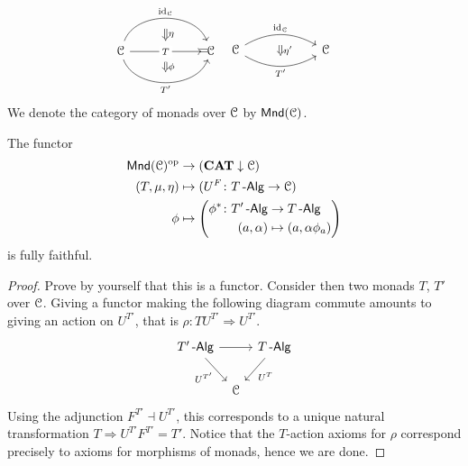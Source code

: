 \documentclass[a4paper,11pt,oneside,openany]{scrbook}
\begin{document}
\begin{defn}
\[\begin{minipage}{0.3\linewidth}
			\begin{tikzcd}[row sep=1cm, column sep=1cm]
				\C\ar[rr, bend left=70, "\id_{\C}", ""{name=id, anchor=center}]\ar[rr, "T" description, ""{name=T1, anchor=center}]\ar[rr, bend right=70, swap, "T'", ""{name=T2, anchor=center}]
				&& \C
				\ar[Rightarrow, shorten <= .6em, shorten >= .6em, "\eta", from=id, to=T1]
				\ar[Rightarrow, shorten <= .6em, shorten >= .6em, "\phi", from=T1, to=T2]
			\end{tikzcd}
		\end{minipage}
		\hspace{-1.3cm}
		=
		\hspace{.4cm}
		\begin{minipage}{0.3\linewidth}
			\begin{tikzcd}[row sep=1cm, column sep=1cm]
				\C\ar[rr, bend left, "\id_{\C}", ""{name=id, anchor=center}]\ar[rr, bend right, swap, "T'", ""{name=T2, anchor=center}]
				&& \C
				\ar[Rightarrow, shorten <= .6em, shorten >= .6em, "\eta'", from=id, to=T2]
			\end{tikzcd}
		\end{minipage}
	\]
	We denote the category of monads over $\operatorname{\mathcal{C}}$ by $\operatorname{\mathsf{Mnd}}(\operatorname{\mathcal{C}})$.
\end{defn}

\begin{prop}
	The functor
	\begin{align*}
		\operatorname{\mathsf{Mnd}}(\operatorname{\mathcal{C}})^{\operatorname{\text{op}}} & \rightarrow({\normalfont\textbf{CAT}}\downarrow\operatorname{\mathcal{C}})                       \\
		(T,\mu,\eta)   & \mapsto(U^F\colon T\operatorname{-\mathsf{Alg}}\rightarrow\operatorname{\mathcal{C}})               \\
		\phi           & \mapsto\left(\begin{aligned}
				\phi^*\colon T'\operatorname{-\mathsf{Alg}} & \rightarrow T\operatorname{-\mathsf{Alg}}        \\
				(a,\alpha)          & \mapsto (a,\alpha\phi_a)
			\end{aligned}\right)
	\end{align*}
	is fully faithful.
\end{prop}

\begin{proof}
	Prove by yourself that this is a functor. Consider then two monads $T$, $T'$ over $\operatorname{\mathcal{C}}$. Giving a functor making the following diagram commute amounts to giving an action on $U^{T'}$, that is $\rho\colon TU^{T'}\Rightarrow U^{T'}$.
	\[
		\begin{tikzcd}[column sep=tiny]
			T'\Alg\ar[rr]\ar[dr, swap, "U^{T'}"]
			&& T\Alg\ar[dl, "U^T"] \\
			& \C
		\end{tikzcd}
	\]
	Using the adjunction $F^{T'}\dashv U^{T'}$, this corresponds to a unique natural transformation $T\Rightarrow U^{T'}F^{T'}=T'$. Notice that the $T$-action axioms for $\rho$ correspond precisely to axioms for morphisms of monads, hence we are done.
\end{proof}
\end{document}
